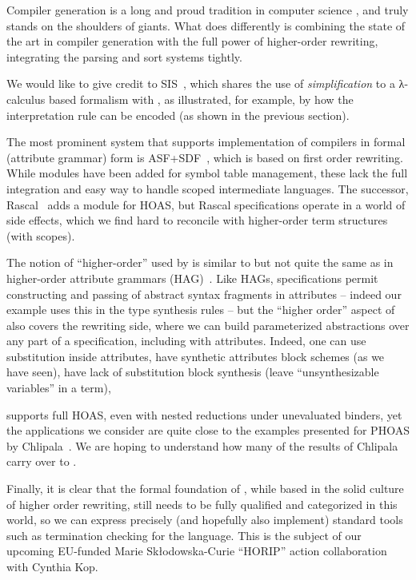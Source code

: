 \documentclass[letterpaper]{llncs}
\begin{document}
Compiler generation is a long and proud tradition in computer science
\cite{GilbertMcLellan:sjcp1967,%
  FeldmanGries:cacm1968,%
  Mosses:daimi1979,%
  Gaudel:fpc1981,%
  BjornerJones:1982,%
  CameronIto:toplas1984,%
  Wand:sn1984,%
  Borras+:sde1988,%
  Brand+:toplas2002,%
  Bos+:eptcs2011}, and \HAX truly stands on the shoulders of giants. What \HAX does differently is
combining the state of the art in compiler generation with the full power of higher-order rewriting,
integrating the parsing and sort systems tightly.

We would like to give credit to SIS~\cite{Mosses:daimi1979}, which shares the use of
\emph{simplification} to a λ-calculus based formalism with \HAX, as illustrated, for example, by how
the interpretation rule can be encoded (as shown in the previous section).

The most prominent system that supports implementation of compilers in formal (attribute grammar)
form is ASF+SDF~\cite{Brand+:toplas2002}, which is based on first order rewriting. While modules
have been added for symbol table management, these lack the full integration and easy way to handle
scoped intermediate languages. The successor, Rascal~\cite{Bos+:eptcs2011} adds a module for HOAS,
but Rascal specifications operate in a world of side effects, which we find hard to reconcile with
higher-order term structures (with scopes).

The notion of ``higher-order'' used by \HAX is similar to but not quite the same as in higher-order
attribute grammars (HAG)~\cite{VogtSwierstraKuiper:pldi1989}. Like HAGs, \HAX specifications permit
constructing and passing of abstract syntax fragments in attributes -- indeed our example uses this
in the type synthesis rules -- but the ``higher order'' aspect of \HAX also covers the rewriting
side, where we can build parameterized abstractions over any part of a specification, including with
attributes. Indeed, one can use substitution inside attributes, have synthetic attributes block
schemes (as we have seen), have lack of substitution block synthesis (leave ``unsynthesizable
variables'' in a term), \etc

\HAX supports full HOAS, even with nested reductions under unevaluated binders, yet the applications
we consider are quite close to the examples presented for PHOAS by
Chlipala~\cite{Chlipala:icfp2008}. We are hoping to understand how many of the results of Chlipala
carry over to \HAX.

Finally, it is clear that the formal foundation of \HAX, while based in the solid culture of higher
order rewriting, still needs to be fully qualified and categorized in this world, so we can express
precisely (and hopefully also implement) standard tools such as termination checking for the
language. This is the subject of our upcoming EU-funded Marie Skłodowska-Curie ``HORIP'' action
collaboration with Cynthia Kop.
\end{document}
